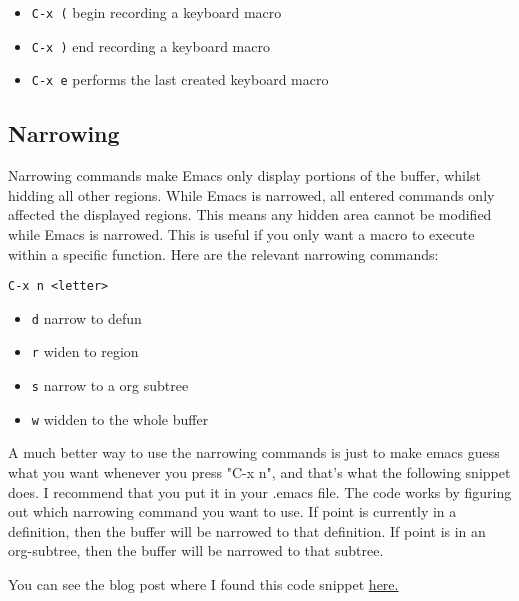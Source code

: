 \documentclass[11pt]{article}
\begin{document}
\begin{itemize}
\item \texttt{C-x (} begin recording a keyboard macro
\item \texttt{C-x )} end recording a keyboard macro
\item \texttt{C-x e}  performs the last created keyboard macro
\end{itemize}
\subsection{Narrowing}
\label{sec:orgheadline13}
Narrowing commands make Emacs only display portions of the buffer, whilst hidding all other regions.  While Emacs is narrowed, all entered commands only affected the displayed regions.  This means any hidden area cannot be modified while Emacs is narrowed.  This is useful if you only want a macro to execute within a specific function.  Here are the relevant narrowing commands:

\texttt{C-x n <letter>}
\begin{itemize}
\item \texttt{d} narrow to defun
\item \texttt{r} widen to region
\item \texttt{s} narrow to a org subtree
\item \texttt{w} widden to the whole buffer
\end{itemize}

A much better way to use the narrowing commands is just to make emacs guess what you want whenever you press "C-x n", and that's what the following snippet does.   I recommend that you put it in your .emacs file.  The code works by figuring out which narrowing command you want to use.  If point is currently in a definition, then the buffer will be narrowed to that definition.  If point is in an org-subtree, then the buffer will be narrowed to that subtree.

You can see the blog post where I found this code snippet \href{http://endlessparentheses.com/emacs-narrow-or-widen-dwim.html}{here.}
\end{document}
